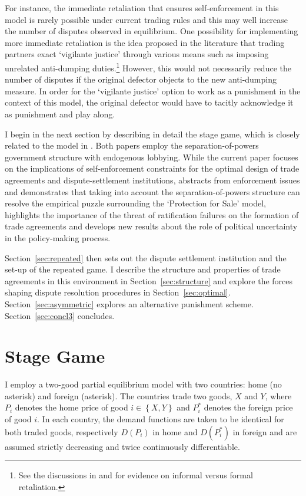 \documentclass[authoryear, review]{elsarticle}
\begin{document}
For instance, the immediate retaliation that ensures self-enforcement in this model is rarely possible under current trading rules and this may well increase the number of disputes observed in equilibrium. One possibility for implementing more immediate retaliation is the idea proposed in the literature that trading partners exact `vigilante justice' through various means such as imposing unrelated anti-dumping duties.\footnote{See the discussions in \citet{bown2005} and \citet{martinvergote} for evidence on informal versus formal retaliation.} However, this would not necessarily reduce the number of disputes if the original defector objects to the new anti-dumping measure. In order for the `vigilante justice' option to work as a punishment in the context of this model, the original defector would have to tacitly acknowledge it as punishment and play along.

I begin in the next section by describing in detail the stage game, which is closely related to the model in \citet{buzard2013b}. Both papers employ the separation-of-powers government structure with endogenous lobbying. While the current paper focuses on the implications of self-enforcement constraints for the optimal design of trade agreements and dispute-settlement institutions, \citet{buzard2013b} abstracts from enforcement issues and demonstrates that taking into account the separation-of-powers structure can resolve the empirical puzzle surrounding the \citet{gh94} `Protection for Sale' model, highlights the importance of the threat of ratification failures on the formation of trade agreements and develops new results about the role of political uncertainty in the policy-making process.

Section~\ref{sec:repeated} then sets out the dispute settlement institution and the set-up of the repeated game. I describe the structure and properties of trade agreements in this environment in Section~\ref{sec:structure} and explore the forces shaping dispute resolution procedures in Section~\ref{sec:optimal}. Section~\ref{sec:asymmetric} explores an alternative punishment scheme. Section~\ref{sec:concl3} concludes.


\section{Stage Game}
\label{sec:stage}
I employ a two-good partial equilibrium model with two countries: home (no asterisk) and foreign (asterisk).  The countries trade two goods, $X$ and $Y$, where $P_i$ denotes the home price of good $i \in \left\{X,Y\right\}$ and $P_i^*$ denotes the foreign price of good $i$. In each country, the demand functions are taken to be identical for both traded goods, respectively $D(P_i)$ in home and $D(P_i^*)$ in foreign and are assumed strictly decreasing and twice continuously differentiable.
\end{document}
